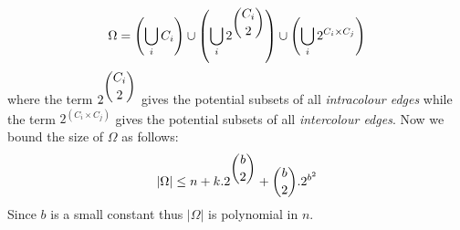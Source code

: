 \begin{equation*}
\Omega = \left(\bigcup_iC_i\right)\cup \left(\bigcup_i2^{\dbinom{C_i}{2}}\right) \cup\left(\bigcup_i2^{C_i\times C_j}\right)
\end{equation*}
where the term $2^{\dbinom{C_i}{2}}$ gives the potential subsets of all \emph{intracolour edges} while the term $2^{(C_i\times C_j)}$ gives the potential subsets of all \emph{intercolour edges}. Now we bound the size of $\Omega$ as follows:
\begin{equation*}
|\Omega| \leq n + k.2^{\dbinom{b}{2}} + \dbinom{b}{2}.2^{b^2}
\end{equation*}
Since $b$ is a small constant thus $|\Omega|$ is polynomial in $n$.